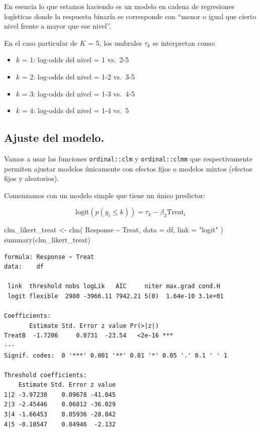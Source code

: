 \documentclass[
  letterpaper,
  DIV=11,
  numbers=noendperiod]{scrartcl}
\newenvironment{Shaded}{\begin{snugshade}}{\end{snugshade}}
\newcommand{\AttributeTok}[1]{\textcolor[rgb]{0.40,0.45,0.13}{#1}}
\newcommand{\FunctionTok}[1]{\textcolor[rgb]{0.28,0.35,0.67}{#1}}
\newcommand{\NormalTok}[1]{\textcolor[rgb]{0.00,0.23,0.31}{#1}}
\newcommand{\OtherTok}[1]{\textcolor[rgb]{0.00,0.23,0.31}{#1}}
\newcommand{\SpecialCharTok}[1]{\textcolor[rgb]{0.37,0.37,0.37}{#1}}
\newcommand{\StringTok}[1]{\textcolor[rgb]{0.13,0.47,0.30}{#1}}
\providecommand{\tightlist}{%
  \setlength{\itemsep}{0pt}\setlength{\parskip}{0pt}}\usepackage{longtable,booktabs,array}
\begin{document}
En esencia lo que estamos haciendo es un modelo en cadena de regresiones
logísticas donde la respuesta binaría se corresponde con ``menor o igual
que cierto nivel frente a mayor que ese nivel''.

En el caso particular de \(K\) = 5, los umbrales \(\tau_k\) se
interpretan como:

\begin{itemize}
\tightlist
\item
  \(k\) = 1: log-odds del nivel = 1 vs.~2-5
\item
  \(k\) = 2: log-odds del nivel = 1-2 vs.~3-5
\item
  \(k\) = 3: log-odds del nivel = 1-3 vs.~4-5
\item
  \(k\) = 4: log-odds del nivel = 1-4 vs.~5
\end{itemize}

\hypertarget{ajuste-del-modelo.}{%
\subsection{Ajuste del modelo.}\label{ajuste-del-modelo.}}

Vamos a usar las funciones \texttt{ordinal::clm} y
\texttt{ordinal::clmm} que respectivamente permiten ajustar modelos
únicamente con efectos fijos o modelos mixtos (efectos fijos y
aleatorios).

Comenzamos con un modelo simple que tiene un único predictor:

\[
\text{logit}(p(y_i \leq k)) = \tau_k - \beta_2 \text{Treat}_i
\]

\begin{Shaded}
\begin{Highlighting}[]
\NormalTok{clm\_likert\_treat }\OtherTok{\textless{}{-}}
    \FunctionTok{clm}\NormalTok{(}
\NormalTok{        Response }\SpecialCharTok{\textasciitilde{}}\NormalTok{ Treat,}
        \AttributeTok{data =}\NormalTok{ df, }\AttributeTok{link =} \StringTok{"logit"}
\NormalTok{    )}
\FunctionTok{summary}\NormalTok{(clm\_likert\_treat)}
\end{Highlighting}
\end{Shaded}

\begin{verbatim}
formula: Response ~ Treat
data:    df

 link  threshold nobs logLik   AIC     niter max.grad cond.H 
 logit flexible  2980 -3966.11 7942.21 5(0)  1.64e-10 3.1e+01

Coefficients:
       Estimate Std. Error z value Pr(>|z|)    
TreatB  -1.7206     0.0731  -23.54   <2e-16 ***
---
Signif. codes:  0 '***' 0.001 '**' 0.01 '*' 0.05 '.' 0.1 ' ' 1

Threshold coefficients:
    Estimate Std. Error z value
1|2 -3.97230    0.09678 -41.045
2|3 -2.45446    0.06812 -36.029
3|4 -1.66453    0.05936 -28.042
4|5 -0.10547    0.04946  -2.132
\end{verbatim}
\end{document}
